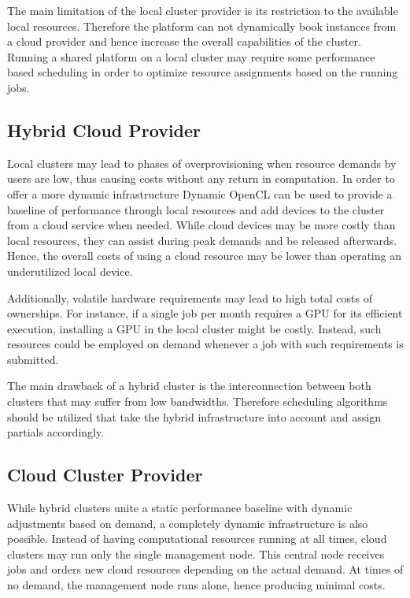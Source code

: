 The main limitation of the local cluster provider is its restriction to the available local resources. Therefore the platform can not dynamically book instances from a cloud provider and hence increase the overall capabilities of the cluster. Running a shared platform on a local cluster may require some performance based scheduling in order to optimize resource assignments based on the running jobs.

\subsection*{Hybrid Cloud Provider}

Local clusters may lead to phases of overprovisioning when resource demands by users are low, thus causing costs without any return in computation. In order to offer a more dynamic infrastructure Dynamic OpenCL can be used to provide a baseline of performance through local resources and add devices to the cluster from a cloud service when needed. While cloud devices may be more costly than local resources, they can assist during peak demands and be released afterwards. Hence, the overall costs of using a cloud resource may be lower than operating an underutilized local device.

Additionally, volatile hardware requirements may lead to high total costs of ownerships. For instance, if a single job per month requires a GPU for its efficient execution, installing a GPU in the local cluster might be costly. Instead, such resources could be employed on demand whenever a job with such requirements is submitted.

The main drawback of a hybrid cluster is the interconnection between both clusters that may suffer from low bandwidths. Therefore scheduling algorithms should be utilized that take the hybrid infrastructure into account and assign partials accordingly.

\subsection*{Cloud Cluster Provider}

While hybrid clusters unite a static performance baseline with dynamic adjustments based on demand, a completely dynamic infrastructure is also possible. Instead of having computational resources running at all times, cloud clusters may run only the single management node. This central node receives jobs and orders new cloud resources depending on the actual demand. At times of no demand, the management node runs alone, hence producing minimal costs.
